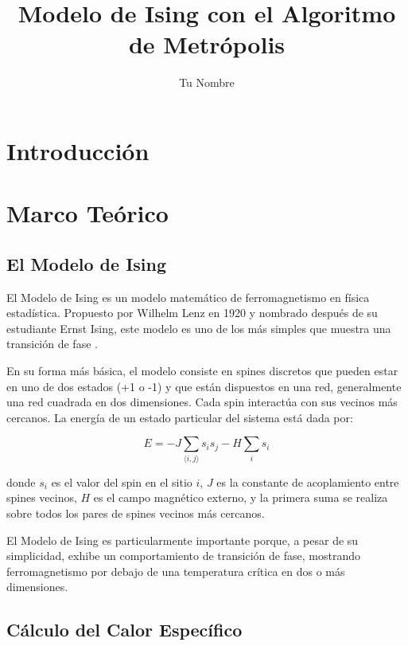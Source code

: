 \documentclass[twocolumn]{article}
\title{Modelo de Ising con el Algoritmo de Metrópolis}
\author{Tu Nombre}
\date{}
\begin{document}
\maketitle

\begin{abstract}
\end{abstract}

\section{Introducción}

\section{Marco Teórico}
\subsection*{El Modelo de Ising}

El Modelo de Ising es un modelo matemático de ferromagnetismo en física estadística. Propuesto por Wilhelm Lenz en 1920 y nombrado después de su estudiante Ernst Ising, este modelo es uno de los más simples que muestra una transición de fase \cite{isingwiki}.

En su forma más básica, el modelo consiste en spines discretos que pueden estar en uno de dos estados (+1 o -1) y que están dispuestos en una red, generalmente una red cuadrada en dos dimensiones. Cada spin interactúa con sus vecinos más cercanos. La energía de un estado particular del sistema está dada por:

\begin{equation}
    E = -J \sum_{\langle i,j \rangle} s_i s_j - H \sum_i s_i
\end{equation}

donde $s_i$ es el valor del spin en el sitio $i$, $J$ es la constante de acoplamiento entre spines vecinos, $H$ es el campo magnético externo, y la primera suma se realiza sobre todos los pares de spines vecinos más cercanos.

El Modelo de Ising es particularmente importante porque, a pesar de su simplicidad, exhibe un comportamiento de transición de fase, mostrando ferromagnetismo por debajo de una temperatura crítica en dos o más dimensiones.

\subsection*{Cálculo del Calor Específico}
\end{document}
